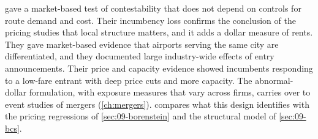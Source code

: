 \citet{WhinstonCollins1992} gave a market-based test of contestability that does not depend on
controls for route demand and cost. Their incumbency loss confirms the conclusion of the pricing
studies that local structure matters, and it adds a dollar measure of rents. They gave market-based
evidence that airports serving the same city are differentiated, and they documented large
industry-wide effects of entry announcements. Their price and capacity evidence showed incumbents
responding to a low-fare entrant with deep price cuts and more capacity. The abnormal-dollar
formulation, with exposure measures that vary across firms, carries over to event studies of mergers
(\cref{ch:mergers}).  compares what this design identifies with the pricing
regressions of \cref{sec:09-borenstein} and the structural model of \cref{sec:09-bcs}.

